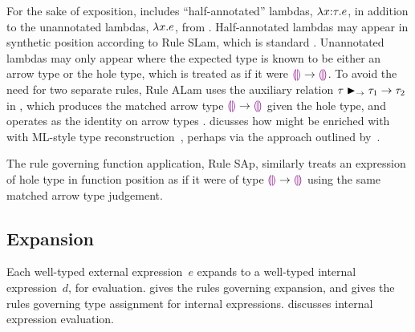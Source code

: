 For the sake of exposition, \HazelnutLive includes ``half-annotated'' lambdas, $\lambda x{:}\tau.e$, in addition to the unannotated lambdas, $\lambda x.e$, from \Hazelnut.
%
Half-annotated lambdas may appear in synthetic position according to Rule {SLam}, which is standard \cite{Chlipala:2005da}.
%
Unannotated lambdas may only appear where the expected type is known to be either an arrow type or the hole type, which is treated as if it were $\textcolor{violet}{\llparenthesis}\textcolor{violet}{\rrparenthesis} \rightarrow \textcolor{violet}{\llparenthesis}\textcolor{violet}{\rrparenthesis}$.
%
To avoid the need for two separate rules, Rule {ALam} uses the auxiliary relation $\tau \blacktriangleright_{\rightarrow} \tau_1 \rightarrow \tau_2$ in , which produces the matched arrow type $\textcolor{violet}{\llparenthesis}\textcolor{violet}{\rrparenthesis} \rightarrow \textcolor{violet}{\llparenthesis}\textcolor{violet}{\rrparenthesis}$ given the hole type, and operates as the identity on arrow types \cite{DBLP:conf/snapl/SiekVCB15,DBLP:conf/popl/GarciaC15}.
%
 dicusses how \HazelnutLive might be enriched with
with ML-style type reconstruction~\cite{damas1982principal}, perhaps via
the approach outlined by~\citet{DBLP:conf/icfp/DunfieldK13}.
%
%
%

The rule governing function application, Rule {SAp}, similarly treats an expression of hole type in function position as if it were of type $\textcolor{violet}{\llparenthesis}\textcolor{violet}{\rrparenthesis} \rightarrow \textcolor{violet}{\llparenthesis}\textcolor{violet}{\rrparenthesis}$ using the same matched arrow type judgement.

\vspace{-4px}
\subsection{Expansion}
\label{sec:expansion}
\vspace{-1px}




Each well-typed external expression~$e$ expands to a well-typed internal expression~$d$, for evaluation.
%
 gives the rules governing expansion, and  gives the rules governing type assignment for internal expressions.
%
 discusses internal expression evaluation.

